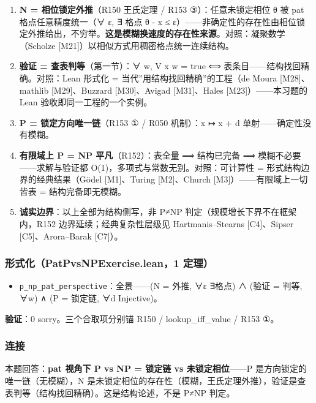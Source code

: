 \documentclass[
]{article}
\providecommand{\tightlist}{%
  \setlength{\itemsep}{0pt}\setlength{\parskip}{0pt}}
\begin{document}
\begin{enumerate}
\def\labelenumi{\arabic{enumi}.}
\tightlist
\item
  \textbf{N = 相位锁定外推}（R150 王氏定理 / R153 ③）：任意未锁定相位 θ
  被 pat 格点任意精度统一（∀ ε, ∃ 格点 \textbar θ - x\textbar{} ≤
  ε）------非确定性的存在性由相位锁定外推给出，不穷举。\textbf{这是模糊换速度的存在性来源}。对照：凝聚数学（Scholze
  {[}M21{]}）以相似方式用稠密格点统一连续结构。
\item
  \textbf{验证 = 查表判等}（第一节）：∀ w, V x w = true ⟺
  表条目------结构找回精确。对照：Lean 形式化 =
  当代''用结构找回精确''的工程（de Moura {[}M28{]}、mathlib
  {[}M29{]}、Buzzard {[}M30{]}、Avigad {[}M31{]}、Hales
  {[}M23{]}）------本习题的 Lean 验收即同一工程的一个实例。
\item
  \textbf{P = 锁定方向唯一链}（R153 ① / R050 机制）：x ↦ x + d
  单射------确定性没有模糊。
\item
  \textbf{有限域上 P = NP 平凡}（R152）：表全量 ⟹ 结构已完备 ⟹
  模糊不必要------求解与验证都 O(1)，多项式与常数无别。对照：可计算性 =
  形式结构边界的经典结果（Gödel {[}M1{]}、Turing {[}M2{]}、Church
  {[}M3{]}）------有限域上一切皆表 = 结构完备即无模糊。
\item
  \textbf{诚实边界}：以上全部为结构侧写，非 P≠NP
  判定（规模增长下界不在框架内，R152 边界延续；经典复杂性层级见
  Hartmanis--Stearns {[}C4{]}、Sipser {[}C5{]}、Arora--Barak
  {[}C7{]}）。
\end{enumerate}

\subsubsection{形式化（PatPvsNPExercise.lean，1
定理）}\label{ux5f62ux5f0fux5316patpvsnpexercise.lean1-ux5b9aux7406-3}

\begin{itemize}
\tightlist
\item
  \texttt{p\_np\_pat\_perspective}：全景------(N = 外推, ∀ε ∃格点) ∧
  (验证 = 判等, ∀w) ∧ (P = 锁定链, ∀d Injective)。
\end{itemize}

\textbf{验证}：0 sorry。三个合取项分别锚 R150 / lookup\_iff\_value /
R153 ①。

\subsubsection{连接}\label{ux8fdeux63a5-3}

本题回答：\textbf{pat 视角下 P vs NP = 锁定链 vs 未锁定相位}------P
是方向锁定的唯一链（无模糊），N
是未锁定相位的存在性（模糊，王氏定理外推），验证是查表判等（结构找回精确）。这是结构论述，不是
P≠NP 判定。
\end{document}

